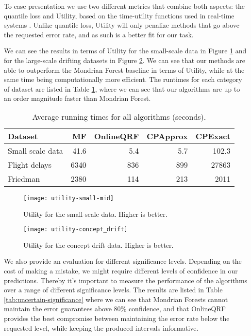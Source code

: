 To ease presentation we use two different metrics that
combine both aspects: the quantile loss \cite{koenker2005qr} and Utility,
based on the time-utility functions used in real-time systems \cite{tuf2005}.
Unlike quantile loss, Utility will only penalize methods that go above
the requested error rate, and as such is a better fit for our task.

We can see the results in terms of Utility for the small-scale data in Figure \ref{fig:utility-small-mid}
and for the large-scale drifting datasets in Figure \ref{fig:utility-concept-drift}.
We can see that our methods are able to outperform the Mondrian Forest baseline
in terms of Utility,
while at the same time being computationally more efficient. The runtimes for each
category of dataset are listed in Table \ref{tab:uncertain-runtimes}, where we
can see that our algorithms are up to an order magnitude faster
than Mondrian Forest.

\begin{table}
	\centering
	\begin{tabular}{l r r r r}
		\toprule
		Dataset      & MF  & OnlineQRF & CPApprox & CPExact  \\
		\midrule
		Small-scale data & 41.6       & 5.4     & 5.7      & 102.3        \\
		Flight delays   & 6340        & 836       & 899       & 27863        \\
		Friedman     & 2380      & 114      & 213      & 2011            \\
		\bottomrule
	\end{tabular}
	\caption{Average running times for all algorithms (seconds).}
	\label{tab:uncertain-runtimes}
\end{table}



\begin{figure}
	\centering
	\texttt{[image: utility-small-mid]}
	\caption{Utility for the small-scale data. Higher is better.}
	\label{fig:utility-small-mid}
\end{figure}

\begin{figure}
	\centering
	\texttt{[image: utility-concept\_drift]}
	\caption{Utility for the concept drift data. Higher is better.}
	\label{fig:utility-concept-drift}
\end{figure}

We also provide an evaluation for different significance levels.
Depending on the cost of making a mistake, we might require different levels of confidence
in our predictions. Thereby it's important to measure the performance of the
algorithms over a range of different significance levels. The results are listed
in Table \ref{tab:uncertain-significance} where we can see that Mondrian Forests cannot maintain the
error guarantees above 80\% confidence, and that OnlineQRF provides the best
compromise between maintaining the error rate below the requested level, while
keeping the produced intervals informative.


